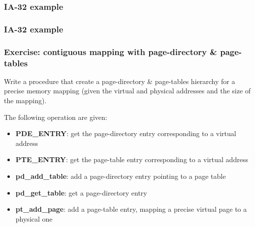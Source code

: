 
\begin{frame}
  \frametitle{IA-32 example}

  \begin{center}
  \end{center}

\end{frame}


\begin{frame}
  \frametitle{IA-32 example}

  \begin{center}
  \end{center}

\end{frame}


\begin{frame}
  \frametitle{Exercise: contiguous mapping with page-directory \&
  page-tables}

  Write a procedure that create a page-directory \& page-tables
  hierarchy for a precise memory mapping (given the virtual and
  physical addresses and the size of the mapping).

  \-

  The following operation are given:

  \begin{itemize}
  \item
    \textbf{PDE\_ENTRY}: get the page-directory entry corresponding to
    a virtual address
  \item
    \textbf{PTE\_ENTRY}: get the page-table entry corresponding to
    a virtual address
  \item
    \textbf{pd\_add\_table}: add a page-directory entry pointing to a
    page table
  \item
    \textbf{pd\_get\_table}: get a page-directory entry
  \item
    \textbf{pt\_add\_page}: add a page-table entry, mapping a precise
    virtual page to a physical one
  \end{itemize}

\end{frame}


